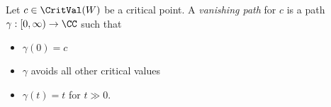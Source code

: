 

Let $c \in \CritVal(W)$ be a critical point. A \emph{vanishing path} for $c$ is a path $\gamma: [0, \infty) \to \CC$ such that 
\begin{itemize}
\item $\gamma(0) = c$ 
\item $\gamma$ avoids all other critical values 
\item $\gamma(t) = t$ for $t \gg 0$. 
\end{itemize}

